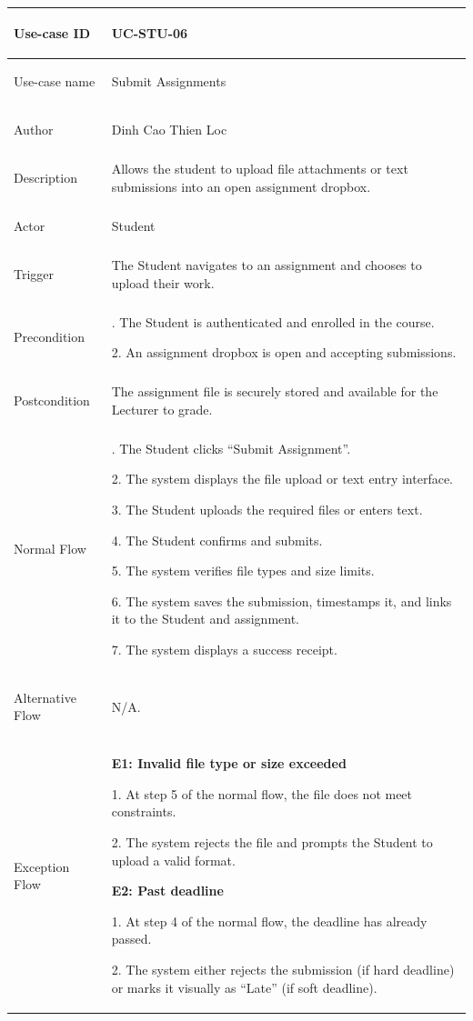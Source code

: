 {
\renewcommand{\arraystretch}{1.1}
\setlength{\tabcolsep}{8pt}
\begin{longtable}{|>{\bfseries\raggedright\arraybackslash}p{}|>{\raggedright\arraybackslash}p{}|}
\hline
Use-case ID & UC-STU-06 \\ \hline
Use-case name & Submit Assignments \\ \hline
Author & Dinh Cao Thien Loc \\ \hline
Description & Allows the student to upload file attachments or text submissions into an open assignment dropbox. \\ \hline
Actor & Student \\ \hline
Trigger & The Student navigates to an assignment and chooses to upload their work. \\ \hline
Precondition &
1. The Student is authenticated and enrolled in the course. \par
2. An assignment dropbox is open and accepting submissions. \\ \hline
Postcondition & The assignment file is securely stored and available for the Lecturer to grade. \\ \hline
Normal Flow &
1. The Student clicks ``Submit Assignment''. \par
2. The system displays the file upload or text entry interface. \par
3. The Student uploads the required files or enters text. \par
4. The Student confirms and submits. \par
5. The system verifies file types and size limits. \par
6. The system saves the submission, timestamps it, and links it to the Student and assignment. \par
7. The system displays a success receipt. \\ \hline
Alternative Flow & N/A. \\ \hline
Exception Flow &
\textbf{E1: Invalid file type or size exceeded} \par
1. At step 5 of the normal flow, the file does not meet constraints. \par
2. The system rejects the file and prompts the Student to upload a valid format. \par\vspace{4pt}
\textbf{E2: Past deadline} \par
1. At step 4 of the normal flow, the deadline has already passed. \par
2. The system either rejects the submission (if hard deadline) or marks it visually as ``Late'' (if soft deadline). \\ \hline
\end{longtable}
}

